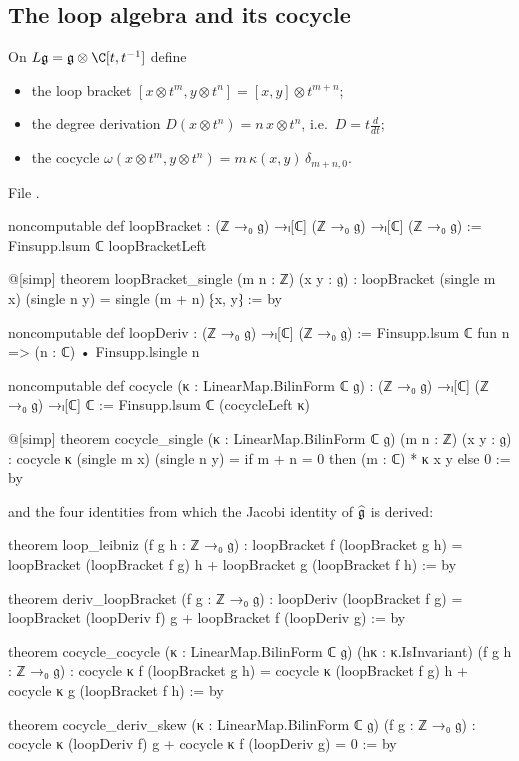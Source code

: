 \subsection{The loop algebra and its cocycle}

\begin{definition}\label{l02:def:loop}
On $L\ltwog = \ltwog\otimes\C[t,t^{-1}]$ define
\begin{itemize}
\item the loop bracket $[x\otimes t^m, y\otimes t^n] = [x,y]\otimes t^{m+n}$;
\item the degree derivation $D(x\otimes t^n) = n\,x\otimes t^n$, i.e.\ $D = t\frac{d}{dt}$;
\item the cocycle $\omega(x\otimes t^m, y\otimes t^n) = m\,\kappa(x,y)\,\delta_{m+n,0}$.
\end{itemize}
\end{definition}

File .
\begin{leancode}
noncomputable def loopBracket : (ℤ →₀ 𝔤) →ₗ[ℂ] (ℤ →₀ 𝔤) →ₗ[ℂ] (ℤ →₀ 𝔤) :=
  Finsupp.lsum ℂ loopBracketLeft

@[simp] theorem loopBracket_single (m n : ℤ) (x y : 𝔤) :
    loopBracket (single m x) (single n y) = single (m + n) ⁅x, y⁆ := by

noncomputable def loopDeriv : (ℤ →₀ 𝔤) →ₗ[ℂ] (ℤ →₀ 𝔤) :=
  Finsupp.lsum ℂ fun n => (n : ℂ) • Finsupp.lsingle n

noncomputable def cocycle (κ : LinearMap.BilinForm ℂ 𝔤) :
    (ℤ →₀ 𝔤) →ₗ[ℂ] (ℤ →₀ 𝔤) →ₗ[ℂ] ℂ :=
  Finsupp.lsum ℂ (cocycleLeft κ)

@[simp] theorem cocycle_single (κ : LinearMap.BilinForm ℂ 𝔤) (m n : ℤ) (x y : 𝔤) :
    cocycle κ (single m x) (single n y) = if m + n = 0 then (m : ℂ) * κ x y else 0 := by
\end{leancode}
and the four identities from which the Jacobi identity of $\widehat{\mathfrak{g}}$ is derived:
\begin{leancode}
theorem loop_leibniz (f g h : ℤ →₀ 𝔤) :
    loopBracket f (loopBracket g h)
      = loopBracket (loopBracket f g) h + loopBracket g (loopBracket f h) := by

theorem deriv_loopBracket (f g : ℤ →₀ 𝔤) :
    loopDeriv (loopBracket f g)
      = loopBracket (loopDeriv f) g + loopBracket f (loopDeriv g) := by

theorem cocycle_cocycle (κ : LinearMap.BilinForm ℂ 𝔤) (hκ : κ.IsInvariant) (f g h : ℤ →₀ 𝔤) :
    cocycle κ f (loopBracket g h)
      = cocycle κ (loopBracket f g) h + cocycle κ g (loopBracket f h) := by

theorem cocycle_deriv_skew (κ : LinearMap.BilinForm ℂ 𝔤) (f g : ℤ →₀ 𝔤) :
    cocycle κ (loopDeriv f) g + cocycle κ f (loopDeriv g) = 0 := by
\end{leancode}

